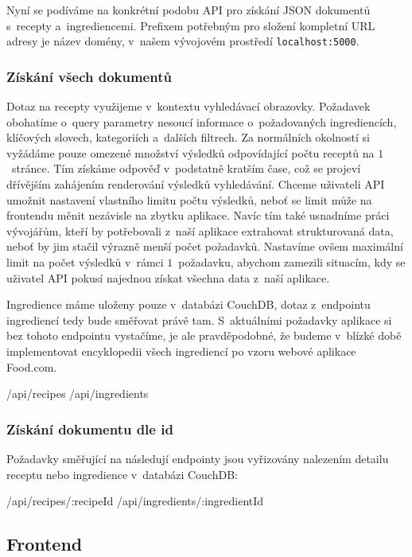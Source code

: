 Nyní se podíváme na konkrétní podobu API pro získání JSON dokumentů s~recepty a~ingrediencemi. Prefixem potřebným pro složení kompletní URL adresy je název domény, v~našem vývojovém prostředí \texttt{localhost:5000}.

\subsubsection{Získání všech dokumentů}

Dotaz na recepty využijeme v~kontextu vyhledávací obrazovky. Požadavek obohatíme o~query parametry nesoucí informace o~požadovaných ingrediencích, klíčových slovech, kategoriích a~dalších filtrech. Za normálních okolností si vyžádáme pouze omezené množství výsledků odpovídající počtu receptů na $1$~stránce. Tím získáme odpověď v~podstatně kratším čase, což se projeví dřívějším zahájením renderování výsledků vyhledávání. Chceme uživateli API umožnit nastavení vlastního limitu počtu výsledků, neboť se limit může na frontendu měnit nezávisle na zbytku aplikace. Navíc tím také usnadníme práci vývojářům, kteří by potřebovali z~naší aplikace extrahovat strukturovaná data, neboť by jim stačil výrazně menší počet požadavků. Nastavíme ovšem maximální limit na počet výsledků v~rámci $1$~požadavku, abychom zamezili situacím, kdy se uživatel API pokusí najednou získat všechna data z~naší aplikace.

Ingredience máme uloženy pouze v~databázi CouchDB, dotaz z~endpointu ingrediencí tedy bude směřovat právě tam. S~aktuálními požadavky aplikace si bez tohoto endpointu vystačíme, je ale pravděpodobné, že budeme v~blízké době implementovat encyklopedii všech ingrediencí po vzoru webové aplikace Food.com.

\begin{code}
/api/recipes
/api/ingredients
\end{code}

\subsubsection{Získání dokumentu dle id}

Požadavky směřující na následují endpointy jsou vyřizovány nalezením detailu receptu nebo ingredience v~databázi CouchDB:

\begin{code}
/api/recipes/:recipeId
/api/ingredients/:ingredientId
\end{code}

\subsection{Frontend}

